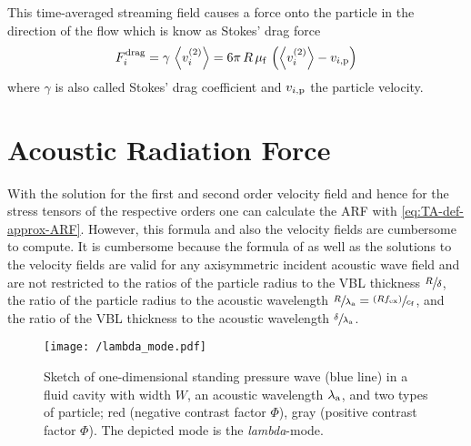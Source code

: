 
This time-averaged streaming field causes a force onto the particle in the 
direction of the flow which is know as Stokes' drag force
\begin{equation}
  F^{\mathrm{drag}}_{i} = \gamma\,\left\langle v_{i}^{(2)} \right\rangle = 
  6\pi\,R\,\mu_{\mathrm{f}}\,
  \left( \left\langle v_{i}^{(2)} \right\rangle - v_{i,\mathrm{p}} \right)
  \label{eq:TA-drag-force}
\end{equation}
where $\gamma$ is also called Stokes' drag coefficient and $v_{i,\mathrm{p}}$ 
the particle velocity.


\section{Acoustic Radiation Force\label{sec:TA-ARF}}

With the solution for the first and second order velocity field and hence for 
the stress tensors of the respective orders one can calculate the ARF with 
\cref{eq:TA-def-approx-ARF}. However, this formula and also the velocity fields 
are cumbersome to compute. It is cumbersome because the formula of 
 as well as the solutions to the velocity fields are 
valid for any axisymmetric incident acoustic wave field and are not restricted 
to the ratios of the particle radius to the VBL thickness $\sfrac{R}{\delta}$, 
the ratio of the particle radius to the acoustic wavelength 
$\sfrac{R}{\lambda_{\mathrm{a}}} = \sfrac{(Rf_{\mathrm{ex}})}{c_{\mathrm{f}}}$, and the ratio of 
the VBL thickness to the acoustic wavelength 
$\sfrac{\delta}{\lambda_{\mathrm{a}}}$.

\begin{figure}[tbp]
  \centering
  \texttt{[image: /lambda\_mode.pdf]}
  \caption{Sketch of one-dimensional standing pressure wave (blue line) in a 
      fluid cavity with width $W$, an acoustic wavelength 
      $\lambda_{\mathrm{a}}$, and two types of particle; red (negative contrast 
      factor $\Phi$), gray (positive contrast factor $\Phi$). The depicted mode 
  is the \emph{lambda}-mode.}
  \label{fig:TA-lambda_mode}
\end{figure}

